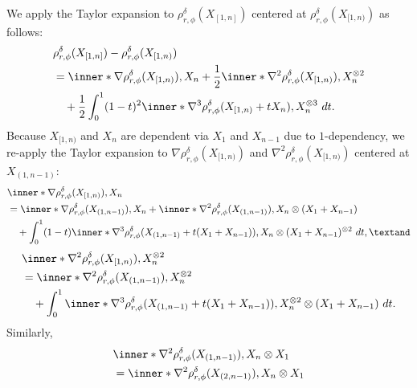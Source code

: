 \documentclass[aos]{imsart}
\begin{document}
\begin{appendix}
We apply the Taylor expansion to $\rho_{r,\phi}^{\delta}(X_{[1,n]})$ centered at $\rho_{r,\phi}^\delta(X_{[1,n)})$ as follows:
\begin{equation*}
\begin{aligned}
    & \rho_{r,\phi}^{\delta}(X_{[1,n]}) - \rho_{r,\phi}^\delta(X_{[1,n)}) \\
    & = \inner*{\nabla \rho_{r,\phi}^\delta(X_{[1,n)}), X_n} 
    + \frac{1}{2} \inner*{\nabla^2 \rho_{r,\phi}^\delta(X_{[1,n)}), X_n^{\otimes 2}} \\
    & \quad + \frac{1}{2} \int_0^1 (1-t)^2 \inner*{
    \nabla^3 \rho_{r,\phi}^\delta(X_{[1,n)} + t X_n), X_n^{\otimes 3}} ~dt.
\end{aligned}
\end{equation*}
Because $X_{[1,n)}$ and $X_n$ are dependent via $X_1$ and $X_{n-1}$ due to $1$-dependency, we re-apply the Taylor expansion to $\nabla \rho_{r,\phi}^\delta(X_{[1,n)})$ and $\nabla^2 \rho_{r,\phi}^\delta(X_{[1,n)})$ centered at $X_{(1,n-1)}$:
\begin{equation*}
\begin{aligned}
    & \inner*{ \nabla \rho_{r,\phi}^\delta(X_{[1,n)}), X_n } \\
    & = \inner*{ \nabla \rho_{r,\phi}^\delta(X_{(1,n-1)}), X_n }
    + \inner*{\nabla^2 \rho_{r,\phi}^\delta(X_{(1,n-1)}), X_n \otimes (X_1 + X_{n-1})} \\
    & \quad + \int_0^1 (1-t) 
    \inner*{ \nabla^3 \rho_{r,\phi}^\delta(X_{(1,n-1)} + t (X_1 + X_{n-1})),
    X_n \otimes (X_1 + X_{n-1})^{\otimes 2}} ~dt, \textand
\end{aligned}
\end{equation*}
\begin{equation*}
\begin{aligned}
    & \inner*{ \nabla^2 \rho_{r,\phi}^\delta(X_{[1,n)}), X_n^{\otimes 2} } \\
    & = \inner*{ \nabla^2 \rho_{r,\phi}^\delta(X_{(1,n-1)}), X_n^{\otimes 2} } \\
    & \quad + \int_0^1 
    \inner*{ \nabla^3 \rho_{r,\phi}^\delta(X_{(1,n-1)} + t (X_1 + X_{n-1})),
    X_n^{\otimes 2} \otimes (X_1 + X_{n-1})} ~dt.
\end{aligned}
\end{equation*}
Similarly,
\begin{equation*}
\begin{aligned}
    & \inner*{\nabla^2 \rho_{r,\phi}^\delta(X_{(1,n-1)}), X_n \otimes X_1} \\
    & = \inner*{\nabla^2 \rho_{r,\phi}^\delta(X_{(2,n-1)}), X_n \otimes X_1} \\

\end{aligned}
\end{equation*}
\end{appendix}
\end{document}
